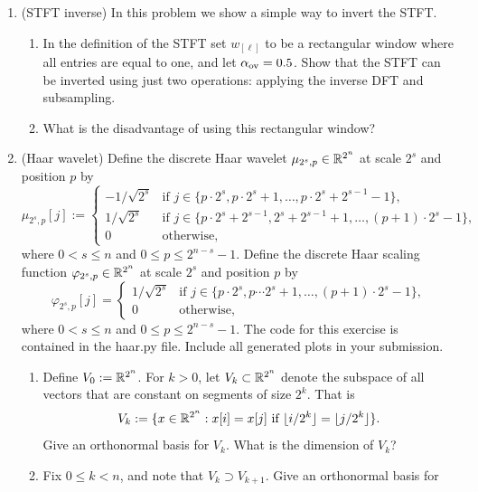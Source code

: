 \documentclass[12pt,twoside]{article}
\begin{document}
\begin{enumerate}
\begin{enumerate}
 \end{enumerate}
  
 \newpage
 \item (STFT inverse) In this problem we show a simple way to invert the STFT.
 \begin{enumerate}
  \item In the definition of the STFT set $w_{[\ell]}$ to be a rectangular window where all entries are equal to one, and let $\alpha_{\operatorname{ov}}=0.5$. Show that the STFT can be inverted using just two operations: applying the inverse DFT and subsampling.
  \item What is the disadvantage of using this rectangular window?
  \end{enumerate}
 
 \item (Haar wavelet) Define the discrete Haar wavelet $\mu_{2^s,p}\in\mathbb{R}^{2^n}$ at scale
  $2^s$ and position $p$ by
  $$\mu_{2^s,p}[j] :=
  \begin{cases}
    -1/\sqrt{2^{s}} & \text{if $j\in\{p\cdot 2^s,p\cdot 2^s+1,\ldots,p\cdot 2^s+2^{s-1}-1\}$,}\\
    1/\sqrt{2^{s}} & \text{if $j\in\{p\cdot 2^s+2^{s-1},2^s+2^{s-1}+1,\ldots,(p+1)\cdot2^{s}-1\}$,}\\
    0 & \text{otherwise,}
  \end{cases}
  $$
  where $0<s\leq n$ and $0 \leq p \leq 2^{n-s}-1$.  Define the
  discrete Haar scaling function $\varphi_{2^s,p}\in\mathbb{R}^{2^n}$ at scale $2^s$ and position $p$  by
  $$\varphi_{2^s,p}[j]=
  \begin{cases}
    1/\sqrt{2^{s}} & \text{if $j\in\{p\cdot 2^s,p\cdots 2^s+1,\ldots,(p+1)\cdot 2^{s}-1\}$,}\\
    0 & \text{otherwise,}
  \end{cases}$$
  where $0<s\leq n$ and $0\leq p\leq 2^{n-s}-1$.
  The code for this
  exercise is contained in the haar.py file. Include all generated plots in your submission.
  \begin{enumerate}
  \item Define $V_0:=\mathbb{R}^{2^n}$.  For $k>0$, let $V_k\subset\mathbb{R}^{2^n}$ denote the subspace
    of all vectors that are constant on segments of size $2^k$.  That
    is
    $$V_k := \{x\in\mathbb{R}^{2^n}: \text{$x[i] = x[j]$ if $\lfloor
      i/2^k\rfloor = \lfloor j/2^k\rfloor$}\}.$$
    Give an orthonormal basis for $V_k$.  What is the dimension of
    $V_k$? 
  \item Fix $0\leq k < n$, and note that $V_k\supset V_{k+1}$.  Give an orthonormal basis for

\end{enumerate}
\end{enumerate}
\end{document}
